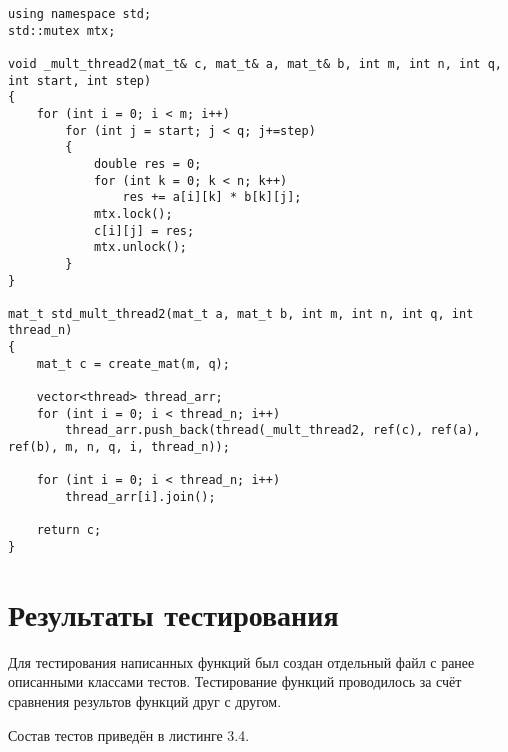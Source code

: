 \begin{lstlisting}[caption = {Функция умножения матриц (параллельная по столбцам)}, captionpos=b]
using namespace std;
std::mutex mtx;

void _mult_thread2(mat_t& c, mat_t& a, mat_t& b, int m, int n, int q, int start, int step)
{
	for (int i = 0; i < m; i++)
		for (int j = start; j < q; j+=step)
		{
			double res = 0;
			for (int k = 0; k < n; k++)
				res += a[i][k] * b[k][j];
			mtx.lock();
			c[i][j] = res;
			mtx.unlock();
		}
}

mat_t std_mult_thread2(mat_t a, mat_t b, int m, int n, int q, int thread_n)
{
	mat_t c = create_mat(m, q);
	
	vector<thread> thread_arr;
	for (int i = 0; i < thread_n; i++)
		thread_arr.push_back(thread(_mult_thread2, ref(c), ref(a), ref(b), m, n, q, i, thread_n));
	
	for (int i = 0; i < thread_n; i++)
		thread_arr[i].join();
	
	return c;
}
\end{lstlisting}


\section{Результаты тестирования}
Для тестирования написанных функций был создан отдельный файл с ранее описанными классами тестов. Тестирование функций проводилось за счёт сравнения результов функций друг с другом.

Состав тестов приведён в листинге 3.4.

